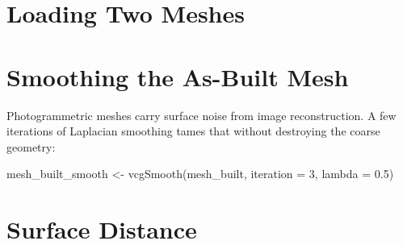 \documentclass[
  11pt,
  letterpaper,
  DIV=11,
  numbers=noendperiod]{scrreprt}
\newenvironment{Shaded}{\begin{snugshade}}{\end{snugshade}}
\newcommand{\AttributeTok}[1]{\textcolor[rgb]{0.40,0.45,0.13}{#1}}
\newcommand{\CommentTok}[1]{\textcolor[rgb]{0.37,0.37,0.37}{#1}}
\newcommand{\DecValTok}[1]{\textcolor[rgb]{0.68,0.00,0.00}{#1}}
\newcommand{\FloatTok}[1]{\textcolor[rgb]{0.68,0.00,0.00}{#1}}
\newcommand{\FunctionTok}[1]{\textcolor[rgb]{0.28,0.35,0.67}{#1}}
\newcommand{\NormalTok}[1]{\textcolor[rgb]{0.00,0.23,0.31}{#1}}
\newcommand{\OtherTok}[1]{\textcolor[rgb]{0.00,0.23,0.31}{#1}}
\newcommand{\SpecialCharTok}[1]{\textcolor[rgb]{0.37,0.37,0.37}{#1}}
\newcommand{\StringTok}[1]{\textcolor[rgb]{0.13,0.47,0.30}{#1}}
\begin{document}
\section{Loading Two Meshes}\label{loading-two-meshes}

\begin{Shaded}
\end{Shaded}

\section{Smoothing the As-Built Mesh}\label{smoothing-the-as-built-mesh}

Photogrammetric meshes carry surface noise from image reconstruction. A
few iterations of Laplacian smoothing tames that without destroying the
coarse geometry:

\begin{Shaded}
\begin{Highlighting}[]
\NormalTok{mesh\_built\_smooth }\OtherTok{\textless{}{-}} \FunctionTok{vcgSmooth}\NormalTok{(mesh\_built, }\AttributeTok{iteration =} \DecValTok{3}\NormalTok{, }\AttributeTok{lambda =} \FloatTok{0.5}\NormalTok{)}
\end{Highlighting}
\end{Shaded}

\section{Surface Distance}\label{surface-distance}
\end{document}
